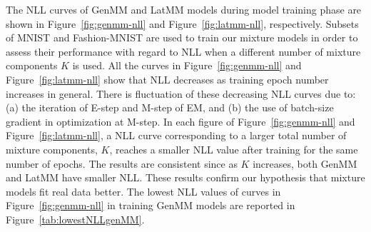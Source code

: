 The NLL curves of GenMM and LatMM models during model training phase are shown in Figure~\ref{fig:genmm-nll} and Figure~\ref{fig:latmm-nll}, respectively. Subsets of MNIST and Fashion-MNIST are used to train our mixture models in order to assess their performance with regard to NLL when a different number of mixture components $K$ is used. All the curves in Figure~\ref{fig:genmm-nll} and Figure~\ref{fig:latmm-nll} show that NLL decreases as training epoch number increases in general. There is fluctuation of these decreasing NLL curves due to: (a) the iteration of E-step and M-step of EM, and (b) the use of batch-size gradient in optimization at M-step. In each figure of Figure~\ref{fig:genmm-nll} and Figure~\ref{fig:latmm-nll}, a NLL curve corresponding to a larger total number of mixture components, $K$, reaches a smaller NLL value after training for the same number of epochs. The results are consistent since as $K$ increases, both GenMM and LatMM have smaller NLL. These results confirm our hypothesis that mixture models fit real data better. The lowest NLL values of curves in Figure~\ref{fig:genmm-nll} in training GenMM models are reported in Figure~\ref{tab:lowestNLLgenMM}.

